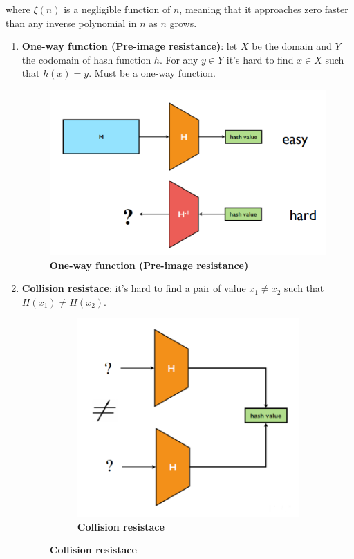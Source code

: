 \documentclass[10pt,a4paper]{report}
\begin{document}
where $\xi(n)$ is a negligible function of $n$, meaning that it approaches zero faster than any inverse polynomial in $n$ as $n$ grows.
\begin{enumerate}
	\item 
	\textbf{One-way function (Pre-image resistance)}: let $X$ be the domain and $Y$ the codomain of hash function $h$. For any $y \in Y$ it's hard to find $x \in X$ such that $h(x) = y$. Must be a one-way function.
	\begin{figure}[h]
		\centering
		\includegraphics[scale=0.50]{images/Pasted image 20230319105914.png}
		\caption{\textbf{One-way function (Pre-image resistance)}}
	\end{figure}
	\item 
	\textbf{Collision resistace}: it's hard to find a pair of value $x_{1} \neq x_{2}$ such that $H(x_{1}) \neq H(x_{2})$.\\
	\begin{figure}
		\centering
		\begin{subfigure}{.5\textwidth}
			\centering
			\includegraphics[width=.6\linewidth]{images/Pasted image 20230319110056.png}
			\caption{\textbf{Collision resistace}}

\end{subfigure}
\end{figure}
\end{enumerate}
\end{document}
